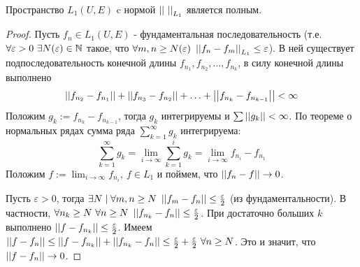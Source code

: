 \begin{theorem*}
    Пространство $L_1(U, E)$ c нормой $\left| \left|   \  \right| \right|_{L_1}$ является полным.
    \begin{proof}
        Пусть $f_n \in L_1(U, E)$ - фундаментальная последовательность (т.е. $\forall \varepsilon > 0 \ \exists N(\varepsilon) \in \mathbb{N}$ такое, что $\forall m, n \ge N(\varepsilon) \ \left| \left|  f_n - f_m \right| \right|_{L_1} \le \varepsilon$). В ней существует подпоследовательность конечной длины $f_{n_1}, f_{n_2}, \hdots, f_{n_k}$, в силу конечной длины выполнено
        \[\left| \left|  f_{n_2} - f_{n_1} \right| \right| + \left| \left|  f_{n_3} - f_{n_2} \right| \right| + \hdots + \left| \left|  f_{n_k} - f_{n_{k-1}} \right| \right| < \infty\]
        Положим $g_k:= f_{n_k} - f_{n_{k-1}}$, тогда $g_k$ интегрируемы и $\sum \left| \left|  g_k \right| \right| < \infty$. По теореме о нормальных рядах
        сумма ряда $\sum_{k=1}^{\infty} g_k$ интегрируема:
        \[\sum_{k=1}^{\infty} g_k = \lim_{i \to \infty} \sum_{k=1}^{i}g_k = \lim_{i \to \infty} f_{n_i} - f_{n_1}\]
        Положим $f:= \lim_{i \to \infty} f_{n_i}, \ f \in L_1$ и поймем, что $\left| \left|  f_n - f \right| \right| \to 0$.
        \par
        Пусть $\varepsilon > 0$, тогда $\exists N \mid \forall m, n \ge N \ \norm{f_m - f_n} \le \frac{\varepsilon}{2}$ (из фундаментальности). В частности, $\forall n_k \ge N \ \forall n \ge N \ \left| \left|  f_{n_k} - f_n \right| \right| \le \frac{\varepsilon}{2}$. При достаточно больших $k$ выполнено $\left| \left|  f - f_{n_k} \right| \right| \le \frac{\varepsilon}{2}$.
        Имеем $\left| \left|  f - f_n \right| \right| \le \left| \left|  f - f_{n_k} \right| \right| + \left| \left|  f_{n_k} - f_n \right| \right| \le \frac{\varepsilon}{2} + \frac{\varepsilon}{2} \ \forall n \ge N$. Это и значит, что $\left| \left|  f - f_n \right| \right| \to 0$.
    \end{proof}
\end{theorem*}

